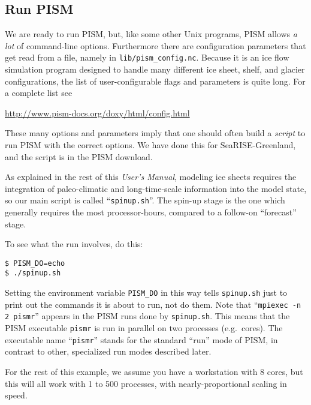 \subsection{Run PISM}   \label{subsect:runscript}  We are ready to run PISM, but, like some other Unix programs, PISM allows \emph{a lot} of command-line options.  Furthermore there are configuration parameters that get read from a file, namely in \texttt{lib/pism_config.nc}.  Because it is an ice flow simulation program designed to handle many different ice sheet, shelf, and glacier configurations, the list of user-configurable flags and parameters is quite long.  For a complete list see
\begin{center}
\url{http://www.pism-docs.org/doxy/html/config.html}
\end{center}

These many options and parameters imply that one should often build a \emph{script} to run PISM with the correct options.  We have done this for SeaRISE-Greenland, and the script is in the PISM download.

As explained in the rest of this \emph{User's Manual}, modeling ice sheets requires the integration of paleo-climatic and long-time-scale information into the model state, so our main script is called ``\texttt{spinup.sh}''.  The spin-up stage is the one which generally requires the most processor-hours, compared to a follow-on ``forecast'' stage.

To see what the run involves, do this:
\begin{verbatim}
$ PISM_DO=echo
$ ./spinup.sh
\end{verbatim}
\noindent Setting the environment variable \texttt{PISM_DO} in this way tells \texttt{spinup.sh} just to print out the commands it is about to run, not do them.  Note that ``\texttt{mpiexec -n 2 pismr}'' appears in the PISM runs done by \texttt{spinup.sh}.  This means that the PISM executable \texttt{pismr} is run in parallel on two processes (e.g.~cores).  The executable name ``\texttt{pismr}'' stands for the standard ``run'' mode of PISM, in contrast to other, specialized run modes described later.

For the rest of this example, we assume you have a workstation with 8 cores, but this will all work with 1 to 500 processes, with nearly-proportional scaling in speed.

